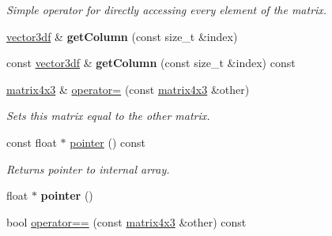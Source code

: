 \begin{DoxyCompactItemize}
\begin{DoxyCompactList}\small\item\em Simple operator for directly accessing every element of the matrix. \end{DoxyCompactList}\item 
\hyperlink{namespaceirr_1_1core_a06f169d08b5c429f5575acb7edbad811}{vector3df} \& {\bfseries get\+Column} (const size\+\_\+t \&index)\hypertarget{classirr_1_1core_1_1matrix4x3_a8125f183b81e21867aef5795c5a287ef}{}\label{classirr_1_1core_1_1matrix4x3_a8125f183b81e21867aef5795c5a287ef}

\item 
const \hyperlink{namespaceirr_1_1core_a06f169d08b5c429f5575acb7edbad811}{vector3df} \& {\bfseries get\+Column} (const size\+\_\+t \&index) const \hypertarget{classirr_1_1core_1_1matrix4x3_ab8bd146a07050934ed3da37b23db08f9}{}\label{classirr_1_1core_1_1matrix4x3_ab8bd146a07050934ed3da37b23db08f9}

\item 
\hyperlink{classirr_1_1core_1_1matrix4x3}{matrix4x3} \& \hyperlink{classirr_1_1core_1_1matrix4x3_a26390c47e84ff97ef07ccc41242b4d83}{operator=} (const \hyperlink{classirr_1_1core_1_1matrix4x3}{matrix4x3} \&other)\hypertarget{classirr_1_1core_1_1matrix4x3_a26390c47e84ff97ef07ccc41242b4d83}{}\label{classirr_1_1core_1_1matrix4x3_a26390c47e84ff97ef07ccc41242b4d83}

\begin{DoxyCompactList}\small\item\em Sets this matrix equal to the other matrix. \end{DoxyCompactList}\item 
const float $\ast$ \hyperlink{classirr_1_1core_1_1matrix4x3_af26dc93c54dd42babbe1bb9d8c7f4408}{pointer} () const \hypertarget{classirr_1_1core_1_1matrix4x3_af26dc93c54dd42babbe1bb9d8c7f4408}{}\label{classirr_1_1core_1_1matrix4x3_af26dc93c54dd42babbe1bb9d8c7f4408}

\begin{DoxyCompactList}\small\item\em Returns pointer to internal array. \end{DoxyCompactList}\item 
float $\ast$ {\bfseries pointer} ()\hypertarget{classirr_1_1core_1_1matrix4x3_ace2538ae12dd881f01f1dc48a0c52a3e}{}\label{classirr_1_1core_1_1matrix4x3_ace2538ae12dd881f01f1dc48a0c52a3e}

\item 
bool \hyperlink{classirr_1_1core_1_1matrix4x3_a4112482eda098a78bccc2d1c69442573}{operator==} (const \hyperlink{classirr_1_1core_1_1matrix4x3}{matrix4x3} \&other) const \hypertarget{classirr_1_1core_1_1matrix4x3_a4112482eda098a78bccc2d1c69442573}{}\label{classirr_1_1core_1_1matrix4x3_a4112482eda098a78bccc2d1c69442573}


\end{DoxyCompactItemize}
